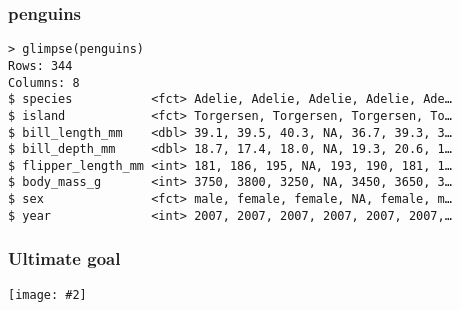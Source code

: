 \documentclass{beamer}
\newcommand{\fig}[2]{\centerline{\texttt{[image: \#2]}}}
\newcommand{\bfr}[1]{\begin{frame}[fragile]\frametitle{{ #1 }}}
\begin{document}
\bfr{penguins}\scriptsize
\begin{verbatim}
> glimpse(penguins)
Rows: 344
Columns: 8
$ species           <fct> Adelie, Adelie, Adelie, Adelie, Ade…
$ island            <fct> Torgersen, Torgersen, Torgersen, To…
$ bill_length_mm    <dbl> 39.1, 39.5, 40.3, NA, 36.7, 39.3, 3…
$ bill_depth_mm     <dbl> 18.7, 17.4, 18.0, NA, 19.3, 20.6, 1…
$ flipper_length_mm <int> 181, 186, 195, NA, 193, 190, 181, 1…
$ body_mass_g       <int> 3750, 3800, 3250, NA, 3450, 3650, 3…
$ sex               <fct> male, female, female, NA, female, m…
$ year              <int> 2007, 2007, 2007, 2007, 2007, 2007,…

\end{verbatim}
\end{frame}

\bfr{Ultimate goal}
\fig{1}{unnamed-chunk-7-1}
\end{frame}
\end{document}
